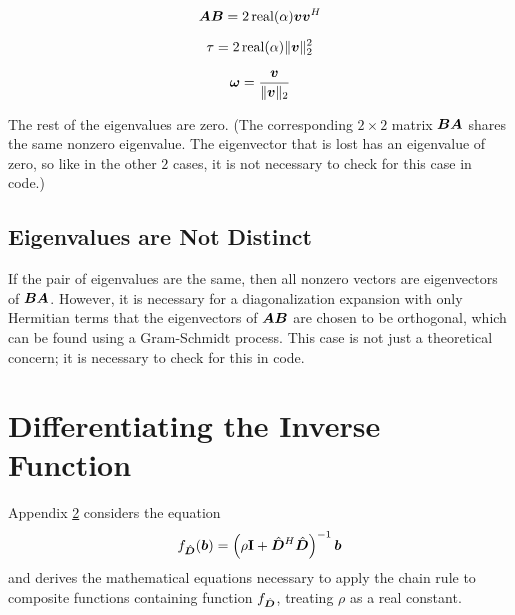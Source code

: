 \begin{appendices}
\begin{equation}
\bm{A}\bm{B} = 2
\operatorname{real}(\alpha)\bm{v}\bm{v}^H
\end{equation}

\begin{equation}
\tau = 2
\operatorname{real}(\alpha) \|\bm{v}\|_2^2
\end{equation}

\begin{equation}
\bm{\omega} = \frac{\bm{v}}{\|\bm{v}\|_2}
\end{equation}

The rest of the eigenvalues are zero.  (The corresponding $2 \times 2$ matrix $\bm{B}\bm{A}$ shares the same nonzero eigenvalue. The eigenvector that is lost has an eigenvalue of zero, so like in the other $2$ cases, it is not necessary to check for this case in code.)

\section{Eigenvalues are Not Distinct}

If the pair of eigenvalues are the same, then all nonzero vectors are eigenvectors of $\bm{B}\bm{A}$. However, it is necessary for a diagonalization expansion with only Hermitian terms that the eigenvectors of $\bm{A}\bm{B}$ are chosen to be orthogonal, which can be found using a Gram-Schmidt process. This case is not just a theoretical concern; it is necessary to check for this in code.

\chapter{Differentiating the Inverse Function} \label{chapter:Differentiating the Inverse Function}
Appendix \ref{chapter:Differentiating the Inverse Function} considers the equation
\begin{equation}
f_{\hat{\bm{D}}}(\bm{b}) = \left(\rho{\bf I} + \hat{\bm{D}}^H\hat{\bm{D}}\right)^{-1}\bm{b} \label{equation:Standard Inversion Function}
\end{equation}
and derives the mathematical equations necessary to apply the chain rule to composite functions containing function $f_{\hat{\bm{D}}}$, treating $\rho$ as a real constant.


\end{appendices}
